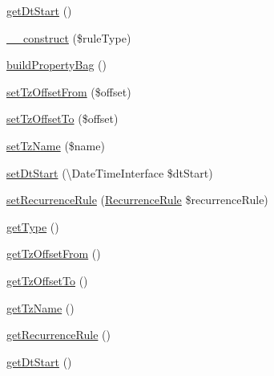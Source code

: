 \begin{DoxyCompactItemize}
\mbox{\hyperlink{class_eluceo_1_1i_cal_1_1_component_1_1_timezone_rule_a1a574efdf94fc99192e26aa965293adb}{get\+Dt\+Start}} ()
\item 
\mbox{\hyperlink{class_eluceo_1_1i_cal_1_1_component_1_1_timezone_rule_af9ae541025f04809b70e8b2a31e0fa61}{\+\_\+\+\_\+construct}} (\$rule\+Type)
\item 
\mbox{\hyperlink{class_eluceo_1_1i_cal_1_1_component_1_1_timezone_rule_a35528a86b1fe5e3640d7964cfe46c201}{build\+Property\+Bag}} ()
\item 
\mbox{\hyperlink{class_eluceo_1_1i_cal_1_1_component_1_1_timezone_rule_adadbfa3ddbeda26f4e615eb07d467920}{set\+Tz\+Offset\+From}} (\$offset)
\item 
\mbox{\hyperlink{class_eluceo_1_1i_cal_1_1_component_1_1_timezone_rule_a7e32fa095725379eff54d1c66f9b1b69}{set\+Tz\+Offset\+To}} (\$offset)
\item 
\mbox{\hyperlink{class_eluceo_1_1i_cal_1_1_component_1_1_timezone_rule_ac8f0eac95662554ce52e247daf89952a}{set\+Tz\+Name}} (\$name)
\item 
\mbox{\hyperlink{class_eluceo_1_1i_cal_1_1_component_1_1_timezone_rule_a161d33d5128049a75e78280467ff9347}{set\+Dt\+Start}} (\textbackslash{}Date\+Time\+Interface \$dt\+Start)
\item 
\mbox{\hyperlink{class_eluceo_1_1i_cal_1_1_component_1_1_timezone_rule_aa74485780bd11e82c18720d6bba9b3b4}{set\+Recurrence\+Rule}} (\mbox{\hyperlink{class_eluceo_1_1i_cal_1_1_property_1_1_event_1_1_recurrence_rule}{Recurrence\+Rule}} \$recurrence\+Rule)
\item 
\mbox{\hyperlink{class_eluceo_1_1i_cal_1_1_component_1_1_timezone_rule_a8d7d4529c2b9d573d8dbe1ab86a3985e}{get\+Type}} ()
\item 
\mbox{\hyperlink{class_eluceo_1_1i_cal_1_1_component_1_1_timezone_rule_a808aa034effa5f37251fb844d2a6cd81}{get\+Tz\+Offset\+From}} ()
\item 
\mbox{\hyperlink{class_eluceo_1_1i_cal_1_1_component_1_1_timezone_rule_aafeda12e4329f3a87fd326546b184e3d}{get\+Tz\+Offset\+To}} ()
\item 
\mbox{\hyperlink{class_eluceo_1_1i_cal_1_1_component_1_1_timezone_rule_a2c832422bfc268aed12d7116ac65ca62}{get\+Tz\+Name}} ()
\item 
\mbox{\hyperlink{class_eluceo_1_1i_cal_1_1_component_1_1_timezone_rule_aa0a37d70f8cd2741dca701b150ecb4eb}{get\+Recurrence\+Rule}} ()
\item 
\mbox{\hyperlink{class_eluceo_1_1i_cal_1_1_component_1_1_timezone_rule_a1a574efdf94fc99192e26aa965293adb}{get\+Dt\+Start}} ()

\end{DoxyCompactItemize}
